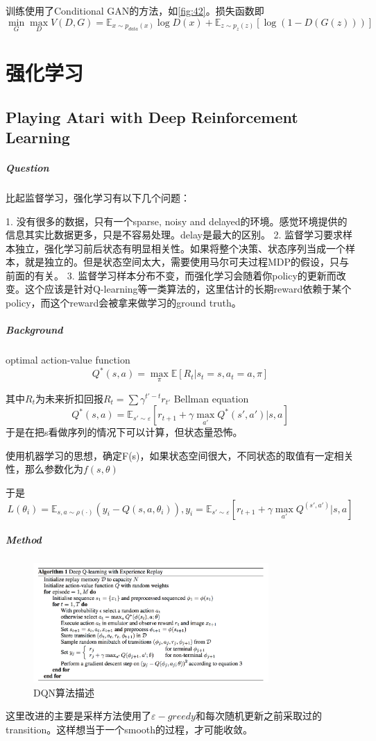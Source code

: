 \documentclass[a4paper]{article}
\begin{document}
训练使用了Conditional GAN的方法，如\ref{fig:42}。损失函数即
$$\min\limits_G\max\limits_D V(D,G)=\mathbb{E}_{x\sim p_{data}(x)}\log D(x) 
+ \mathbb{E}_{z\sim p_z(z)}[\log (1-D(G(z)))]$$
\section{强化学习}
\subsection{Playing Atari with Deep Reinforcement Learning\cite{DBLP:journals/corr/MnihKSGAWR13}}
\subparagraph{Question}
比起监督学习，强化学习有以下几个问题：

1. 没有很多的数据，只有一个sparse, noisy and delayed的环境。感觉环境提供的信息其实比数据更多，只是不容易处理。delay是最大的区别。
2. 监督学习要求样本独立，强化学习前后状态有明显相关性。如果将整个决策、状态序列当成一个样本，就是独立的。但是状态空间太大，需要使用马尔可夫过程MDP的假设，只与前面的有关。
3. 监督学习样本分布不变，而强化学习会随着你policy的更新而改变。这个应该是针对Q-learning等一类算法的，这里估计的长期reward依赖于某个policy，而这个reward会被拿来做学习的ground truth。

\subparagraph{Background}
optimal action-value function $$Q^*(s,a)=\max_\pi\mathbb{E}[R_t|s_t=s,a_t=a,\pi]$$

其中$R_t$为未来折扣回报$R_t=\sum \gamma^{t'-t}r_{t'}$
Bellman equation $$Q^*(s, a) = \mathbb{E}_{s'\sim \varepsilon}[r_{t+1} + \gamma\max\limits_{a'}Q^* (s',a')|s,a]$$
于是在把s看做序列的情况下可以计算，但状态量恐怖。

使用机器学习的思想，确定F(s)，如果状态空间很大，不同状态的取值有一定相关性，那么参数化为$f(s,\theta)$

于是$$L(\theta_i) = \mathbb{E}_{s,a\sim \rho(\cdot)}(y_i - Q(s,a,\theta_i)), y_i = \mathbb{E}_{s'\sim \varepsilon}[r_{t+1} + \gamma\max\limits_{a'}Q^(s',a')|s,a]$$

\subparagraph{Method}

\begin{figure}
\centering
\includegraphics[width=0.8\textwidth]{./img/26.png}
\caption{DQN算法描述}
\label{fig:26}
\end{figure}
这里改进的主要是采样方法使用了$\varepsilon-greedy$和每次随机更新之前采取过的transition。这样想当于一个smooth的过程，才可能收敛。
\end{document}
